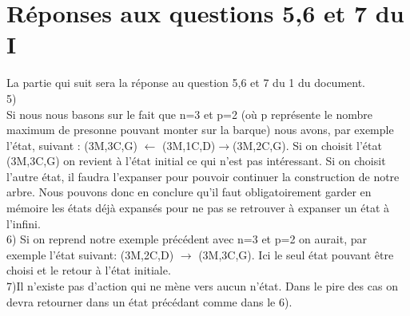 \documentclass[a4paper, 12pt, french,oneside]{book}
\begin{document}
\section{Réponses aux questions 5,6 et 7 du I}
La partie qui suit sera la réponse au question 5,6 et 7 du 1 du document. \\
5) \\
Si nous nous  basons sur le fait que n=3 et p=2 (où p représente le nombre maximum de presonne pouvant monter sur la barque) nous avons, par exemple l'état, suivant :
(3M,3C,G) $\leftarrow$ (3M,1C,D)$\rightarrow$(3M,2C,G). Si on choisit l'état (3M,3C,G) on revient à l'état initial ce qui n'est pas intéressant. Si on choisit l'autre état, il faudra l'expanser pour pouvoir continuer la construction de notre arbre. Nous pouvons donc en conclure qu'il faut obligatoirement garder en mémoire les états déjà expansés pour ne pas se retrouver à expanser un état à l'infini.\\
6) Si on reprend notre exemple précédent avec n=3 et p=2 on aurait, par exemple l'état suivant: (3M,2C,D) $\rightarrow$ (3M,3C,G). Ici le seul état pouvant être choisi et le retour à l'état initiale.\\
7)Il n'existe pas d'action qui ne mène vers aucun n'état. Dans le pire des cas on devra retourner dans un état précédant comme dans le 6). \\
\end{document}
